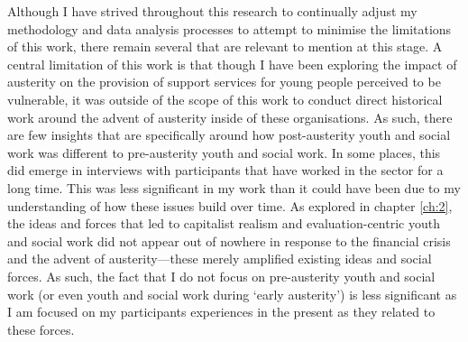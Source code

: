 Although I have strived throughout this research to continually adjust my methodology and data analysis processes to attempt to minimise the limitations of this work, there remain several that are relevant to mention at this stage. A central limitation of this work is that though I have been exploring the impact of austerity on the provision of support services for young people perceived to be vulnerable, it was outside of the scope of this work to conduct direct historical work around the advent of austerity inside of these organisations. As such, there are few insights that are specifically around how post-austerity youth and social work was different to pre-austerity youth and social work. In some places, this did emerge in interviews with participants that have worked in the sector for a long time. This was less significant in my work than it could have been due to my understanding of how these issues build over time. As explored in chapter \ref{ch:2}, the ideas and forces that led to capitalist realism and evaluation-centric youth and social work did not appear out of nowhere in response to the financial crisis and the advent of austerity—these merely amplified existing ideas and social forces. As such, the fact that I do not focus on pre-austerity youth and social work (or even youth and social work during `early austerity') is less significant as I am focused on my participants experiences in the present as they related to these forces. 

